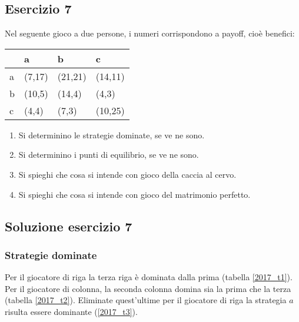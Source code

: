 \documentclass[\main/main.tex]{subfiles}
\begin{document}
\subsection{Esercizio 7}
Nel seguente gioco a due persone, i numeri corrispondono a payoff, cioè benefici:

\begin{table}
  \begin{tabular}{|L|L|L|L|}
    \hline
      & a      & b       & c       \\
    \hline
    a & (7,17) & (21,21) & (14,11) \\
    \hline
    b & (10,5) & (14,4)  & (4,3)   \\
    \hline
    c & (4,4)  & (7,3)   & (10,25) \\
    \hline
  \end{tabular}
\end{table}

\begin{enumerate}
  \item Si determinino le strategie dominate, se ve ne sono.
  \item Si determinino i punti di equilibrio, se ve ne sono.
  \item Si spieghi che cosa si intende con gioco della caccia al cervo.
  \item Si spieghi che cosa si intende con gioco del matrimonio perfetto.
\end{enumerate}

\subsection{Soluzione esercizio 7}

\subsubsection*{Strategie dominate}
Per il giocatore di riga la terza riga è dominata dalla prima (tabella \ref{2017_t1}). Per il giocatore di colonna, la seconda colonna domina sia la prima che la terza (tabella \ref{2017_t2}).
Eliminate quest'ultime per il giocatore di riga la strategia $a$ risulta essere dominante (\ref{2017_t3}).
\end{document}

